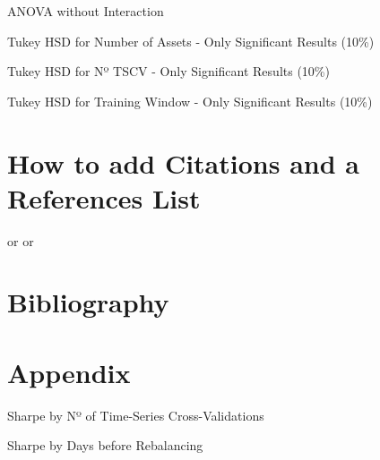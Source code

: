 \documentclass{article}
\begin{document}
\begin{table}[h!]
    \centering
    {\scriptsize
        
    }
    \caption{ANOVA without Interaction}
    \label{tab:anova_multi_factor}
\end{table}

\begin{table}[h!]
    \centering
    {\scriptsize
        
    }
    \caption{Tukey HSD for Number of Assets - Only Significant Results (10\%)}
    \label{tab:tukeyhsd_n_assets}
\end{table}

\begin{table}[h!]
    \centering
    {\scriptsize
        
    }
    \caption{Tukey HSD for Nº TSCV - Only Significant Results (10\%)}
    \label{tab:tukeyhsd_n_tscv}
\end{table}

\begin{table}[h!]
    \centering
    {\scriptsize
        
    }
    \caption{Tukey HSD for Training Window - Only Significant Results (10\%)}
    \label{tab:tukeyhsd_training_window}
\end{table}

\section{How to add Citations and a References List}

\cite{markowitz1952portfolio} or \cite{sharpe1964capital} or \cite{bruder2013regularization}

\newpage
\section*{Bibliography}



\newpage
\section*{Appendix}

\begin{table}[h!]
    \centering
    {\scriptsize
        
    }
    \caption{Sharpe by Nº of Time-Series Cross-Validations}
    \label{tab:time_series_n_tscv}
\end{table}

\begin{table}[h!]
    \centering
    {\scriptsize
        
    }
    \caption{Sharpe by Days before Rebalancing}
    \label{tab:time_series_testing_window}
\end{table}
\end{document}
